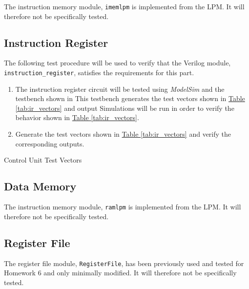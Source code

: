 The instruction memory module, \verb|imemlpm| is implemented from the LPM.
It will therefore not be specifically tested.


\subsection{Instruction Register} %
\label{sub:instruction_register_pro}

The following test procedure will be used to verify that the Verilog module, \verb|instruction_register|, satisfies the requirements for this part.

\begin{enumerate}
    \item The instruction register circuit will be tested using \emph{ModelSim} and the testbench shown in %
    This testbench generates the test vectors shown in \hyperref[tab:ir_vectors]{Table \ref*{tab:ir_vectors}} and output %
    Simulations will be run in order to verify the behavior shown in \hyperref[tab:ir_vectors]{Table \ref*{tab:ir_vectors}}.
    \item Generate the test vectors shown in \hyperref[tab:ir_vectors]{Table \ref*{tab:ir_vectors}}
    and verify the corresponding outputs.
\end{enumerate}

\begin{table}[htbp]
    \centering
    \caption{Control Unit Test Vectors\label{tab:ir_vectors}}
\end{table}


\subsection{Data Memory} %
\label{sub:data_memory}

The instruction memory module, \verb|ramlpm| is implemented from the LPM.
It will therefore not be specifically tested.

\subsection{Register File} %
\label{sub:register_file}

The register file module, \verb|RegisterFile|, has been previously used and tested for Homework 6 and only minimally modified.
It will therefore not be specifically tested.

